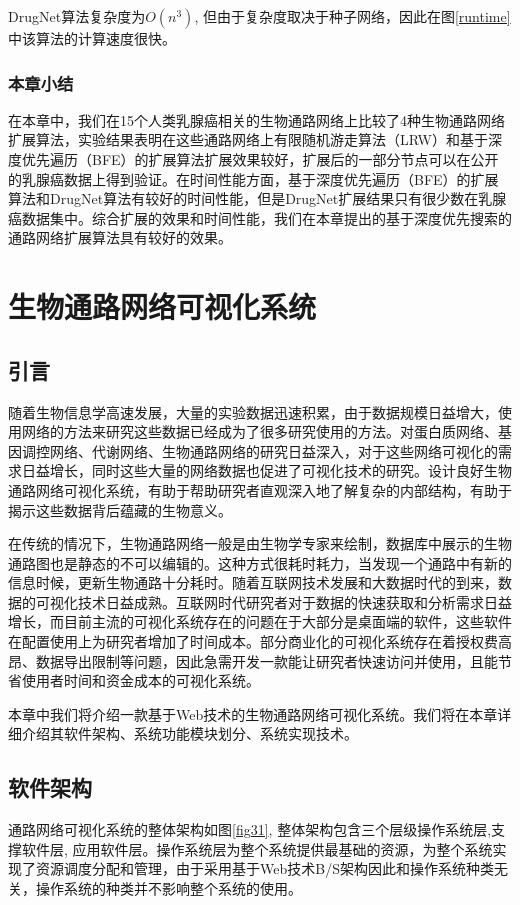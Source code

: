 DrugNet算法复杂度为$O(n^{3})$, 但由于复杂度取决于种子网络，因此在图\ref{runtime}中该算法的计算速度很快。

\subsection{本章小结}
在本章中，我们在15个人类乳腺癌相关的生物通路网络上比较了4种生物通路网络扩展算法，实验结果表明在这些通路网络上有限随机游走算法（LRW）和基于深度优先遍历（BFE）的扩展算法扩展效果较好，扩展后的一部分节点可以在公开的乳腺癌数据上得到验证。在时间性能方面，基于深度优先遍历（BFE）的扩展算法和DrugNet算法有较好的时间性能，但是DrugNet扩展结果只有很少数在乳腺癌数据集中。综合扩展的效果和时间性能，我们在本章提出的基于深度优先搜索的通路网络扩展算法具有较好的效果。


\chapter{生物通路网络可视化系统}
\section{引言}
随着生物信息学高速发展，大量的实验数据迅速积累，由于数据规模日益增大，使用网络的方法来研究这些数据已经成为了很多研究使用的方法。对蛋白质网络、基因调控网络、代谢网络、生物通路网络的研究日益深入，对于这些网络可视化的需求日益增长，同时这些大量的网络数据也促进了可视化技术的研究。设计良好生物通路网络可视化系统，有助于帮助研究者直观深入地了解复杂的内部结构，有助于揭示这些数据背后蕴藏的生物意义。

在传统的情况下，生物通路网络一般是由生物学专家来绘制，数据库中展示的生物通路图也是静态的不可以编辑的。这种方式很耗时耗力，当发现一个通路中有新的信息时候，更新生物通路十分耗时。随着互联网技术发展和大数据时代的到来，数据的可视化技术日益成熟。互联网时代研究者对于数据的快速获取和分析需求日益增长，而目前主流的可视化系统存在的问题在于大部分是桌面端的软件，这些软件在配置使用上为研究者增加了时间成本。部分商业化的可视化系统存在着授权费高昂、数据导出限制等问题，因此急需开发一款能让研究者快速访问并使用，且能节省使用者时间和资金成本的可视化系统。

本章中我们将介绍一款基于Web技术的生物通路网络可视化系统。我们将在本章详细介绍其软件架构、系统功能模块划分、系统实现技术。

\section{软件架构}
通路网络可视化系统的整体架构如图\ref{fig31}, 整体架构包含三个层级操作系统层,支撑软件层, 应用软件层。操作系统层为整个系统提供最基础的资源，为整个系统实现了资源调度分配和管理，由于采用基于Web技术B/S架构因此和操作系统种类无关，操作系统的种类并不影响整个系统的使用。

